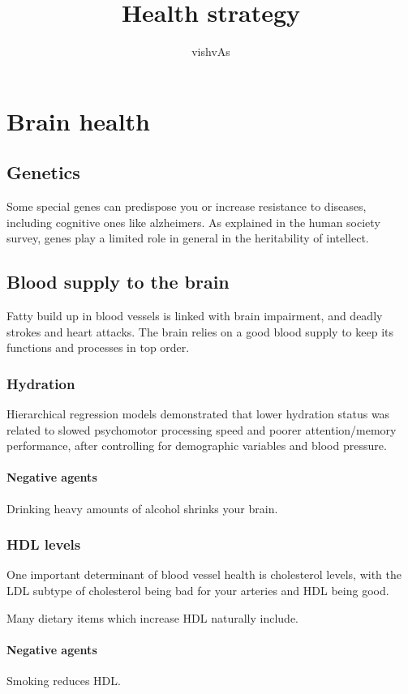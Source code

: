 \documentclass[oneside, article]{memoir}
\title{Health strategy}
\author{vishvAs}
\begin{document}
\maketitle

\chapter{Brain health}
\section{Genetics}
Some special genes can predispose you or increase resistance to diseases, including cognitive ones like alzheimers. As explained in the human society survey, genes play a limited role in general in the heritability of intellect.

\section{Blood supply to the brain}
Fatty build up in blood vessels is linked with brain impairment, and deadly strokes and heart attacks. The brain relies on a good blood supply to keep its functions and processes in top order.

\subsection{Hydration}
Hierarchical regression models demonstrated that lower hydration status was related to slowed psychomotor processing speed and poorer attention/memory performance, after controlling for demographic variables and blood pressure. 

\subsubsection{Negative agents}
Drinking heavy amounts of alcohol shrinks your brain.

\subsection{HDL levels}
One important determinant of blood vessel health is cholesterol levels, with the LDL subtype of cholesterol being bad for your arteries and HDL being good.

Many dietary items which increase HDL naturally include.

\subsubsection{Negative agents}
Smoking reduces HDL.
\end{document}

